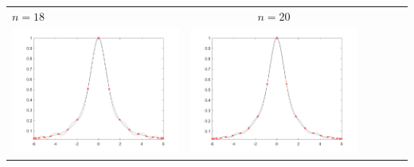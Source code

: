 \begin{tabular}{l*{5}{c}}
\hspace{3.5cm}\(n=18\) &  \(n=20\) \\
\includegraphics[scale=0.5]{cap4/4_7/18.png} &  \includegraphics[scale=0.5]{cap4/4_7/20.png} \\


\end{tabular}
